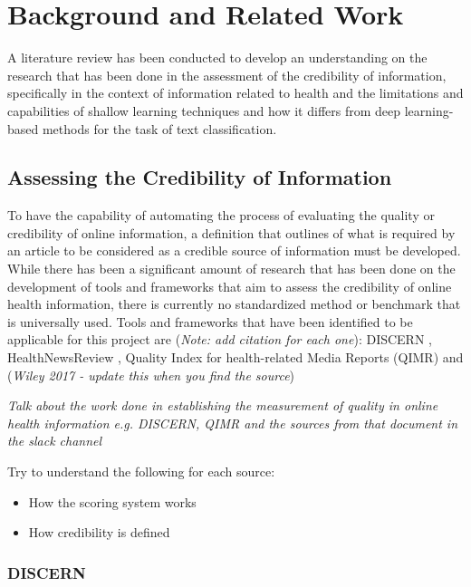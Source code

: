 \documentclass[a4paper,twoside,phd]{BYUPhys}
\begin{document}
\chapter{Background and Related Work}
\label{chap:LitReview}

A literature review has been conducted to develop an understanding on the research that has been done in the assessment of the credibility of information, specifically in the context of information related to health and the limitations and capabilities of shallow learning techniques and how it differs from deep learning-based methods for the task of text classification. 

\section{Assessing the Credibility of Information}

To have the capability of automating the process of evaluating the quality or credibility of online information, a definition that outlines of what is required by an article to be considered as a credible source of information must be developed. While there has been a significant amount of research that has been done on the development of tools and frameworks that aim to assess the credibility of online health information, there is currently no standardized method or benchmark that is universally used. Tools and frameworks that have been identified to be applicable for this project are (\textit{Note: add citation for each one}): DISCERN \cite{DISCERN}, HealthNewsReview \cite{HealthNewsReview}, Quality Index for health-related Media Reports (QIMR) \cite{QIMR} and (\textit{Wiley 2017 - update this when you find the source})

\textit{Talk about the work done in establishing the measurement of quality in online health information e.g. DISCERN, QIMR and the sources from that document in the slack channel}

Try to understand the following for each source:
\begin{itemize}
	\item How the scoring system works
	\item How credibility is defined
\end{itemize}

\subsection{DISCERN}
\label{sec:DISCERN}
\end{document}
